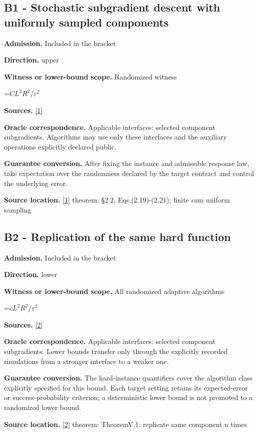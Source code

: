 \documentclass[10pt,a4paper]{article}
\newcommand{\AtlasMath}[1]{\par\begingroup\centering\setbox0=\hbox{$\displaystyle #1$}\ifdim\wd0>1.4\linewidth\typeout{ATLAS WIDE FORMULA: \the\wd0}\fi\ifdim\wd0>\linewidth\resizebox{\linewidth}{!}{\box0}\else\box0\fi\par\endgroup}
\begin{document}
\subsection{B1 - Stochastic subgradient descent with uniformly sampled components}
\textbf{Admission.} Included in the bracket

\textbf{Direction.} upper

\textbf{Witness or lower-bound scope.} Randomized witness

\AtlasMath{C L^2R^2/\varepsilon^2}
\textbf{Sources.} \href{https://www2.isye.gatech.edu/~nemirovs/SIOPT_RSA_2009.pdf}{[1]}

\textbf{Oracle correspondence.} Applicable interfaces: selected component subgradients. Algorithms may use only these interfaces and the auxiliary operations explicitly declared public.

\textbf{Guarantee conversion.} After fixing the instance and admissible response law, take expectation over the randomness declared by the target contract and control the underlying error.

\textbf{Source location.} \href{https://www2.isye.gatech.edu/~nemirovs/SIOPT_RSA_2009.pdf}{[1]} theorem: §2.2, Eqs.(2.19)-(2.21); finite sum uniform sampling

\subsection{B2 - Replication of the same hard function}
\textbf{Admission.} Included in the bracket

\textbf{Direction.} lower

\textbf{Witness or lower-bound scope.} All randomized adaptive algorithms

\AtlasMath{c L^2R^2/\varepsilon^2}
\textbf{Sources.} \href{https://arxiv.org/pdf/1407.5144}{[2]}

\textbf{Oracle correspondence.} Applicable interfaces: selected component subgradients. Lower bounds transfer only through the explicitly recorded simulations from a stronger interface to a weaker one.

\textbf{Guarantee conversion.} The hard-instance quantifiers cover the algorithm class explicitly specified for this bound. Each target setting retains its expected-error or success-probability criterion; a deterministic lower bound is not promoted to a randomized lower bound.

\textbf{Source location.} \href{https://arxiv.org/pdf/1407.5144}{[2]} theorem: TheoremV.1; replicate same component n times
\end{document}
